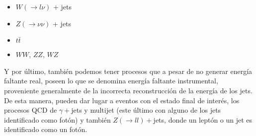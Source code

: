 \begin{itemize}
\item $W(\to l\nu)$ + jets
\item $Z(\to \nu\nu)$ + jets
\item $t\bar{t}$
\item $WW$, $ZZ$, $WZ$
\end{itemize}

Y por último, también podemos tener procesos que a pesar de no generar energía
faltante real, poseen lo que se denomina energía faltante instrumental,
proveniente generalmente de la incorrecta reconstrucción de la energía de los
jets. De esta manera, pueden dar lugar a eventos con el estado final de interés,
los procesos QCD de $\gamma+$jets y multijet (este último con alguno de los jets
identificado como fotón) y también $Z(\to ll)+$jets, donde un leptón o un jet es
identificado como un fotón.





